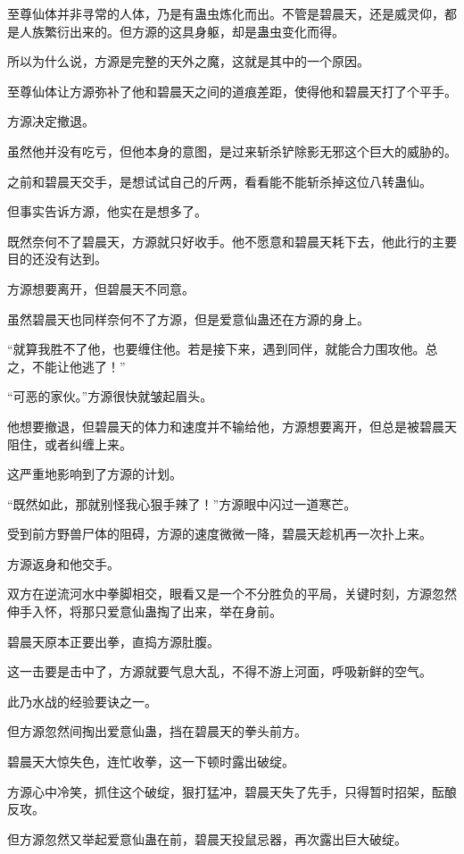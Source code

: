 \begin{this_body}
至尊仙体并非寻常的人体，乃是有蛊虫炼化而出。不管是碧晨天，还是威灵仰，都是人族繁衍出来的。但方源的这具身躯，却是蛊虫变化而得。

所以为什么说，方源是完整的天外之魔，这就是其中的一个原因。

至尊仙体让方源弥补了他和碧晨天之间的道痕差距，使得他和碧晨天打了个平手。

方源决定撤退。

虽然他并没有吃亏，但他本身的意图，是过来斩杀铲除影无邪这个巨大的威胁的。

之前和碧晨天交手，是想试试自己的斤两，看看能不能斩杀掉这位八转蛊仙。

但事实告诉方源，他实在是想多了。

既然奈何不了碧晨天，方源就只好收手。他不愿意和碧晨天耗下去，他此行的主要目的还没有达到。

方源想要离开，但碧晨天不同意。

虽然碧晨天也同样奈何不了方源，但是爱意仙蛊还在方源的身上。

“就算我胜不了他，也要缠住他。若是接下来，遇到同伴，就能合力围攻他。总之，不能让他逃了！”

“可恶的家伙。”方源很快就皱起眉头。

他想要撤退，但碧晨天的体力和速度并不输给他，方源想要离开，但总是被碧晨天阻住，或者纠缠上来。

这严重地影响到了方源的计划。

“既然如此，那就别怪我心狠手辣了！”方源眼中闪过一道寒芒。

受到前方野兽尸体的阻碍，方源的速度微微一降，碧晨天趁机再一次扑上来。

方源返身和他交手。

双方在逆流河水中拳脚相交，眼看又是一个不分胜负的平局，关键时刻，方源忽然伸手入怀，将那只爱意仙蛊掏了出来，举在身前。

碧晨天原本正要出拳，直捣方源肚腹。

这一击要是击中了，方源就要气息大乱，不得不游上河面，呼吸新鲜的空气。

此乃水战的经验要诀之一。

但方源忽然间掏出爱意仙蛊，挡在碧晨天的拳头前方。

碧晨天大惊失色，连忙收拳，这一下顿时露出破绽。

方源心中冷笑，抓住这个破绽，狠打猛冲，碧晨天失了先手，只得暂时招架，酝酿反攻。

但方源忽然又举起爱意仙蛊在前，碧晨天投鼠忌器，再次露出巨大破绽。


\end{this_body}
